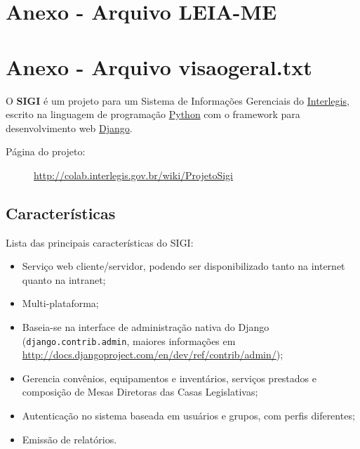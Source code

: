 %
%

\section{Anexo - Arquivo LEIA-ME}
\label{sec:a1}


\section{Anexo - Arquivo visaogeral.txt}
\label{sec:a2}
O \textbf{SIGI} é um projeto para um Sistema de Informações Gerenciais do
\href{http://www.interlegis.gov.br/}{Interlegis}, escrito na linguagem de
programação \href{http://www.python.org}{Python} com o framework para
desenvolvimento web \href{http://www.djangoproject.org}{Django}.
\begin{description}
\item[{Página do projeto}:] %

\href{http://colab.interlegis.gov.br/wiki/ProjetoSigi}{http://colab.interlegis.gov.br/wiki/ProjetoSigi}

\end{description}



\hypertarget{caracter-sticas}{}
\subsection*{Características}

Lista das principais características do SIGI:
\begin{itemize}
\item {} 
Serviço web cliente/servidor, podendo ser disponibilizado tanto na
internet quanto na intranet;

\item {} 
Multi-plataforma;

\item {} Baseia-se na interface de administração nativa do Django
  (\verb|django.contrib.admin|, maiores informações em
  \href{http://docs.djangoproject.com/en/dev/ref/contrib/admin/}{http://docs.djangoproject.com/en/dev/ref/contrib/admin/});

\item {} 
Gerencia convênios, equipamentos e inventários, serviços prestados e
composição de Mesas Diretoras das Casas Legislativas;

\item {} 
Autenticação no sistema baseada em usuários e grupos, com perfis
diferentes;

\item {} 
Emissão de relatórios.

\end{itemize}



